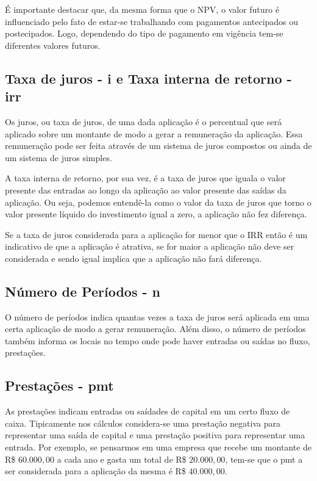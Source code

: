 É importante destacar que, da mesma forma que o NPV, o valor futuro é influenciado pelo fato de estar-se trabalhando com pagamentos antecipados ou postecipados. Logo, dependendo do tipo de pagamento em vigência tem-se diferentes valores futuros.

\subsection{Taxa de juros - i e Taxa interna de retorno - irr}

Os juros, ou taxa de juros, de uma dada aplicação é o percentual que será aplicado sobre um montante de modo a gerar a remuneração da aplicação. Essa remuneração pode ser feita através de um sistema de juros compostos ou ainda de um sistema de juros simples.

A taxa interna de retorno, por sua vez, é a taxa de juros que iguala o valor presente das entradas ao longo da aplicação ao valor presente das saídas da aplicação. Ou seja, podemos entendê-la como o valor da taxa de juros que torno o valor presente líquido do investimento igual a zero, a aplicação não fez diferença.

Se a taxa de juros considerada para a aplicação for menor que o IRR então é um indicativo de que a aplicação é atrativa, se for maior a aplicação não deve ser considerada e sendo igual implica que a aplicação não fará diferença. \cite{irr}

\subsection{Número de Períodos - n}

O número de períodos indica quantas vezes a taxa de juros será aplicada em uma certa aplicação de modo a gerar remuneração. Além disso, o número de períodos também informa os locais no tempo onde pode haver entradas ou saídas no fluxo, prestações.

\subsection{Prestações - pmt}

As prestações indicam entradas ou saídades de capital em um certo fluxo de caixa. Tipicamente nos cálculos considera-se uma prestação negativa para representar uma saída de capital e uma prestação positiva para representar uma entrada. Por exemplo, se pensarmos em uma empresa que recebe um montante de R\$ $60.000,00$ a cada ano e gasta um total de R\$ $20.000,00$, tem-se que o pmt a ser considerada para a aplicação da mesma é R\$ $40.000,00$.


